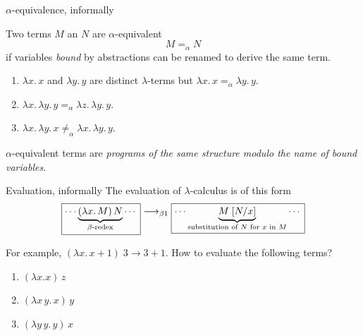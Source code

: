 \begin{frame}{$\alpha$-equivalence, informally}
  \begin{definition}
    Two terms $M$ an $N$ are \alert{$\alpha$-equivalent} 
    \[
      M =_\alpha N
    \]
    if variables \emph{bound} by abstractions can be renamed to derive the same term. 
  \end{definition}
  \begin{example}
    \begin{enumerate}
      \item $\lambda x.\, x$ and $\lambda y.\, y$ are distinct $\lambda$-terms but $\lambda x.\, x
        =_\alpha \lambda y.\, y$. 
      \item $\lambda x.\, \lambda y.\, y =_\alpha 
        \lambda z.\, \lambda y.\, y$. 
      \item $\lambda x.\, \lambda y.\, x \mathrel{\neq}_\alpha
        \lambda x.\, \lambda y.\, y$. 
    \end{enumerate}
  \end{example}
  
  $\alpha$-equivalent terms are \emph{programs of the same structure modulo the name of bound variables}.
\end{frame}

\begin{frame}{Evaluation, informally}
  The \alert{evaluation} of $\lambda$-calculus is of this form 
  \[
    \fbox{$\cdots\underbrace{(\lambda x.\, M)\,N}_{\beta\text{-redex}} \cdots$} \longrightarrow_{\beta 1}
    \fbox{$\cdots \underbrace{M\;[{N}/{x}]}_{\text{substitution of $N$ for $x$ in $M$}} \cdots$}
  \]

  For example, $(\lambda x.\, x +1)\;3 \to 3 + 1$.
  How to evaluate the following terms? 
  \begin{enumerate}
    \item $(\lambda x.x)\,z$
    \item $(\lambda x\, y.\,x)\,y$
    \item $(\lambda y\, y.\,y)\,x$
  \end{enumerate}
\end{frame}


